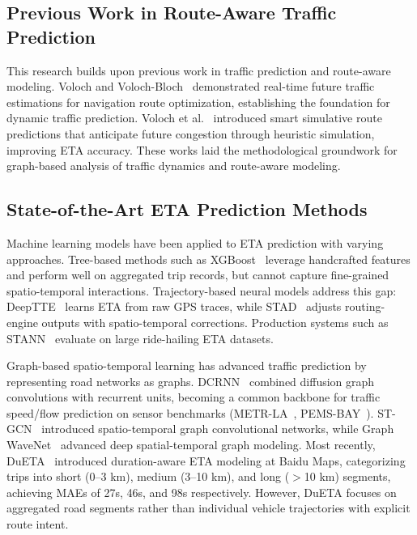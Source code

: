 \subsection{Previous Work in Route-Aware Traffic Prediction}

This research builds upon previous work in traffic prediction and route-aware modeling. Voloch and Voloch-Bloch~\cite{voloch2021} demonstrated real-time future traffic estimations for navigation route optimization, establishing the foundation for dynamic traffic prediction. Voloch et al.~\cite{SmartSimulativeRoute2025} introduced smart simulative route predictions that anticipate future congestion through heuristic simulation, improving ETA accuracy. These works laid the methodological groundwork for graph-based analysis of traffic dynamics and route-aware modeling.

\subsection{State-of-the-Art ETA Prediction Methods}

Machine learning models have been applied to ETA prediction with varying approaches. Tree-based methods such as XGBoost~\cite{chen2016xgboost} leverage handcrafted features and perform well on aggregated trip records, but cannot capture fine-grained spatio-temporal interactions. Trajectory-based neural models address this gap: DeepTTE~\cite{deepTTE2018} learns ETA from raw GPS traces, while STAD~\cite{abbar2020stad} adjusts routing-engine outputs with spatio-temporal corrections. Production systems such as STANN~\cite{stann2021} evaluate on large ride-hailing ETA datasets.

Graph-based spatio-temporal learning has advanced traffic prediction by representing road networks as graphs. DCRNN~\cite{dcrnn2018} combined diffusion graph convolutions with recurrent units, becoming a common backbone for traffic speed/flow prediction on sensor benchmarks (METR-LA~\cite{li2018_metrla}, PEMS-BAY~\cite{pemsbay}). ST-GCN~\cite{yu2018stgcn} introduced spatio-temporal graph convolutional networks, while Graph WaveNet~\cite{wu2019graphwavenet} advanced deep spatial-temporal graph modeling. Most recently, DuETA~\cite{dueta2023} introduced duration-aware ETA modeling at Baidu Maps, categorizing trips into short (0--3 km), medium (3--10 km), and long ($>$10 km) segments, achieving MAEs of 27s, 46s, and 98s respectively. However, DuETA focuses on aggregated road segments rather than individual vehicle trajectories with explicit route intent.

